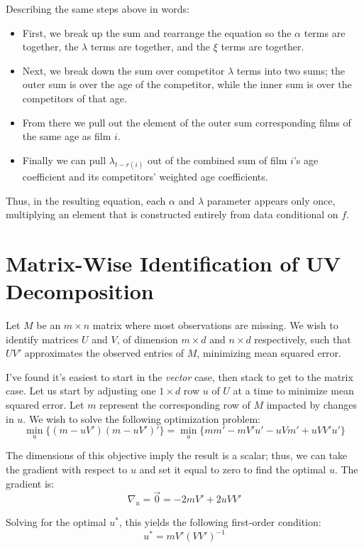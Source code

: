 \documentclass{article}
\begin{document}
\begin{appendices}
Describing the same steps above in words:
\begin{itemize}
    \item First, we break up the sum and rearrange the equation so the $\alpha$ terms are together, the $\lambda$ terms are together, and the $\xi$ terms are together.
    \item Next, we break down the sum over competitor $\lambda$ terms into two sums; the outer sum is over the age of the competitor, while the inner sum is over the competitors of that age.
    \item From there we pull out the element of the outer sum corresponding films of the same age as film $i$.
    \item Finally we can pull $\lambda_{t - r(i)}$ out of the combined sum of film $i$'s age coefficient and its competitors' weighted age coefficients.
\end{itemize}

Thus, in the resulting equation, each $\alpha$ and $\lambda$ parameter appears only once, multiplying an element that is constructed entirely from data conditional on $f$. 

\section{Matrix-Wise Identification of UV Decomposition}
\label{app:uv}

Let $M$ be an $m \times n$ matrix where most observations are missing. We wish to identify matrices $U$ and $V$, of dimension $m \times d$ and $n \times d$ respectively, such that $UV'$ approximates the observed entries of $M$, minimizing mean squared error. 

I've found it's easiest to start in the \emph{vector} case, then stack to get to the matrix case. Let us start by adjusting one $1 \times d$ row $u$ of $U$ at a time to minimize mean squared error. Let $m$ represent the corresponding row of $M$ impacted by changes in $u$. We wish to solve the following optimization problem:
$$\min_{u} \{ (m - uV')(m - uV')' \} = \min_{u} \{mm' - mV'u' - uVm' + uVV'u' \} $$

The dimensions of this objective imply the result is a scalar; thus, we can take the gradient with respect to $u$ and set it equal to zero to find the optimal $u$. The gradient is:
$$\nabla_u = \vec{0} = -2mV' + 2uVV'$$

Solving for the optimal $u^*$, this yields the following first-order condition:
$$u^* = mV'(VV')^{-1}$$


\end{appendices}
\end{document}
